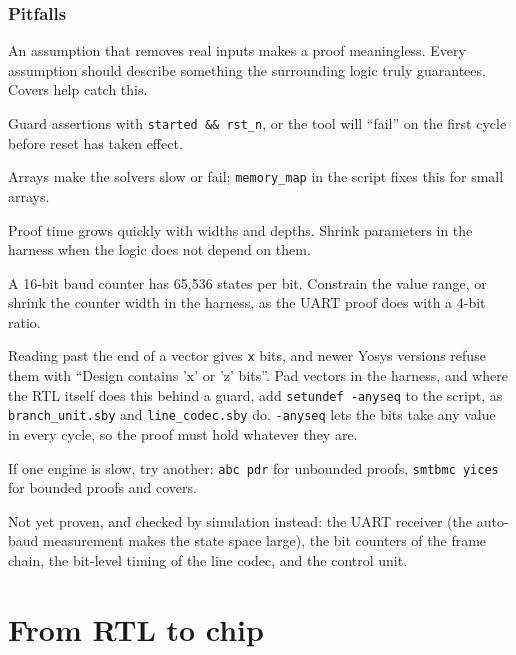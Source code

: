 \documentclass[11pt,a4paper]{article}
\newcommand{\file}[1]{\texttt{#1}}
\begin{document}
\section{Pitfalls}

\begin{description}[style=nextline,leftmargin=1.5em]
\item[Too-strong assumptions] An assumption that removes real inputs makes a proof meaningless. Every assumption should describe something the surrounding logic truly guarantees. Covers help catch this.
\item[Checking during reset] Guard assertions with \texttt{started \&\& rst\_n}, or the tool will ``fail'' on the first cycle before reset has taken effect.
\item[Memories] Arrays make the solvers slow or fail; \texttt{memory\_map} in the script fixes this for small arrays.
\item[Large parameters] Proof time grows quickly with widths and depths. Shrink parameters in the harness when the logic does not depend on them.
\item[Long counters] A 16-bit baud counter has 65,536 states per bit. Constrain the value range, or shrink the counter width in the harness, as the UART proof does with a 4-bit ratio.
\item[Undefined bits] Reading past the end of a vector gives \texttt{x} bits, and newer Yosys versions refuse them with ``Design contains 'x' or 'z' bits''. Pad vectors in the harness, and where the RTL itself does this behind a guard, add \texttt{setundef -anyseq} to the script, as \file{branch\_unit.sby} and \file{line\_codec.sby} do. \texttt{-anyseq} lets the bits take any value in every cycle, so the proof must hold whatever they are.
\item[Solver differences] If one engine is slow, try another: \texttt{abc pdr} for unbounded proofs, \texttt{smtbmc yices} for bounded proofs and covers.
\end{description}

Not yet proven, and checked by simulation instead: the UART receiver (the auto-baud measurement makes the state space large), the bit counters of the frame chain, the bit-level timing of the line codec, and the control unit.

\part{From RTL to chip}\label{part:asic}
\end{document}
